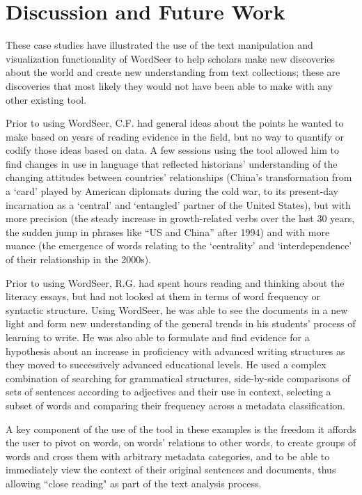 

\section{Discussion and Future Work}

These case studies have illustrated the use of the text manipulation and visualization functionality of WordSeer to help scholars make new discoveries about the world and create new understanding from text collections; these are discoveries that most likely they would not have been able to make with any other existing tool.

Prior to using WordSeer, C.F. had general ideas about the points he wanted to make based on years of reading evidence in the field, but no way to quantify or codify those ideas based on data.  A few sessions using the tool allowed him to find changes in use in language that reflected historians' understanding of the changing attitudes between countries' relationships (China's transformation from a `card' played by American diplomats during the cold war,  to its present-day incarnation as a `central' and `entangled' partner of the United States), but with more precision (the steady increase in growth-related verbs over the last 30 years, the sudden jump in  phrases like ``US and China'' after 1994) and with more nuance (the emergence of words relating to the `centrality' and `interdependence'  of their relationship in the 2000s).


Prior to using WordSeer, R.G. had spent hours reading and thinking about the literacy essays, but had not looked at them in terms of word frequency or syntactic structure.  Using WordSeer, he was able to see the documents in a new light and form new  understanding of the general trends in his students' process of learning to write.   He was also able to formulate and find evidence for a hypothesis about an increase in proficiency with advanced writing structures as they moved to successively advanced educational levels.   He used a complex combination of searching for grammatical structures, side-by-side comparisons of sets of sentences according to adjectives and their use in context, selecting a subset of words and comparing their frequency across a metadata classification.  

A key component of the use of the tool in these examples is the freedom it affords the user to pivot on words, on words' relations to other words, to create groups of words and cross them with arbitrary metadata categories, and to be able to immediately view  the context of their original sentences and documents, thus allowing ``close reading" as part of the text analysis process.

